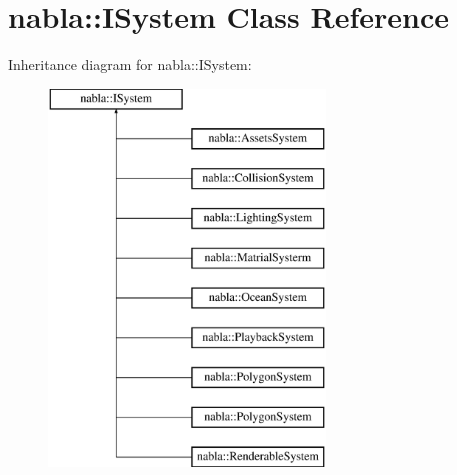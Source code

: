\hypertarget{classnabla_1_1_i_system}{}\section{nabla\+::I\+System Class Reference}
\label{classnabla_1_1_i_system}
Inheritance diagram for nabla\+::I\+System\+:\begin{figure}[H]
\begin{center}
\leavevmode
\includegraphics[height=10.000000cm]{classnabla_1_1_i_system}
\end{center}
\end{figure}
